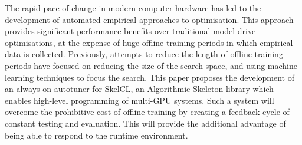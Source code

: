 The rapid pace of change in modern computer hardware has led to the
development of automated empirical approaches to optimisation. This
approach provides significant performance benefits over traditional
model-drive optimisations, at the expense of huge offline training
periods in which empirical data is collected. Previously, attempts to
reduce the length of offline training periods have focused on reducing
the size of the search space, and using machine learning techniques to
focus the search. This paper proposes the development of an always-on
autotuner for SkelCL, an Algorithmic Skeleton library which enables
high-level programming of multi-GPU systems. Such a system will
overcome the prohibitive cost of offline training by creating a
feedback cycle of constant testing and evaluation. This will provide
the additional advantage of being able to respond to the runtime
environment.
